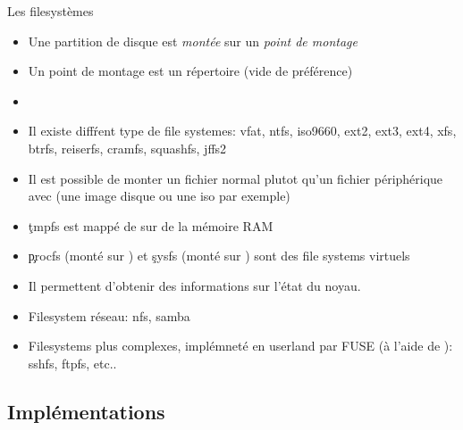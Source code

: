 \begin{frame}[fragile=singleslide]{Les filesystèmes}
  \begin{itemize}
  \item Une  partition de disque est \emph{montée}  sur un \emph{point
      de montage}
  \item Un point de montage est un répertoire (vide de préférence)
  \item {}  
  \item Il existe diffŕent type de file systemes: vfat, ntfs, iso9660,
    ext2, ext3, ext4, xfs, btrfs, reiserfs, cramfs, squashfs, jffs2
  \item  Il est  possible de  monter  un fichier  normal plutot  qu'un
    fichier périphérique avec  (une image disque ou une iso
    par exemple)
  \item \c{tmpfs} est mappé de sur de la mémoire RAM
  \item  \c{procfs}  (monté sur  )  et  \c{sysfs} (monté  sur
    ) sont des file systems virtuels
  \item Il permettent d'obtenir des informations sur l'état du noyau.
  \item Filesystem réseau: nfs, samba
  \item Filesystems plus complexes, implémneté en userland par FUSE (à
    l'aide de ): sshfs, ftpfs, etc..
  \end{itemize}
\end{frame}

\subsection{Implémentations}

